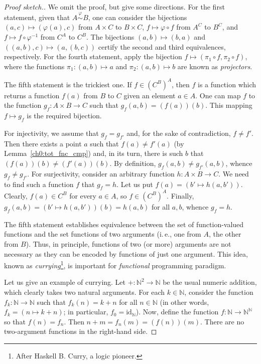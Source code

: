 \documentclass[12pt,notitlepage]{article}
\theoremstyle{plain}
\theoremstyle{definition}
\theoremstyle{plain}
\newcommand{\N}{\mathbb{N}}
\renewcommand{\phi}{\varphi}
\newcommand{\id}{\mathrm{id}}
\newcommand{\1}{\mathbf{1}}
\newcommand{\0}{\mathbf{0}}
\begin{document}
\begin{proof}[Proof sketch.]
	We omit the proof, but give some directions. For the first statement, given that $A \stackrel{\phi}{\sim} B$, one can consider the bijections $(a,c) \mapsto (\phi(a),c)$ from $A \times C$ to $B \times C$, $f \mapsto \phi \circ f$ from $A^C$ to $B^C$, and $f \mapsto f \circ \phi^{-1}$ from $C^A$ to $C^B$. The bijections $(a,b) \mapsto (b,a)$ and $((a,b),c) \mapsto (a,(b,c))$ certify the second and third equivalences, respectively. For the fourth statement, apply the bijection $f \mapsto (\pi_1 \circ f, \pi_2 \circ f)$, where the functions $\pi_1 \colon (a,b) \mapsto a$ and $\pi_2 \colon (a,b) \mapsto b$ are known as \emph{projectors}.
	
	The fifth statement is the trickiest one. If $f \in (C^B)^A$, then $f$ is a function which returns a function $f(a)$ from $B$ to $C$ given an element $a \in A$. One can map $f$ to the function $g_f\colon A \times B \to C$ such that $g_f(a,b) = (f(a))(b)$. This mapping $f \mapsto g_f$ is the required bijection.
	
	For injectivity, we assume that $g_f = g_{f'}$ and, for the sake of contradiction, $f \neq f'$. Then there exists a point $a$ such that $f(a) \neq f'(a)$ (by Lemma~\ref{ch0:tot_fnc_cmp}) and, in its turn, there is such $b$ that $(f(a))(b) \neq (f'(a))(b)$. By definition, $g_f(a,b) \neq g_{f'}(a,b)$, whence $g_f \neq g_{f'}$. For surjectivity, consider an arbitrary function $h\colon A \times B \to C$. We need to find such a function $f$ that $g_f = h$. Let us put $f(a) = (b' \mapsto h(a,b'))$. Clearly, $f(a) \in C^B$ for every $a \in A$, so $f \in (C^B)^A$. Finally, $g_f(a,b) = (b' \mapsto h(a,b'))(b) = h(a,b)$ for all $a, b$, whence $g_f = h$.
	
	The fifth statement establishes equivalence between the set of function-valued functions and the set functions of two arguments (i.\,e., one from $A$, the other from $B$). Thus, in principle, functions of two (or more) arguments are not necessary as they can be encoded by functions of just one argument. This idea, known as \emph{currying}\footnote{After Haskell B. Curry, a logic pioneer.}, is important for \emph{functional} programming paradigm.
	
	Let us give an example of currying. Let ${+}\colon \N^2 \to \N$ be the usual numeric addition, which clearly takes two natural arguments. For each $k \in \N$, consider the function $f_k\colon \N \to \N$ such that $f_k(n) = k + n$ for all $n \in \N$ (in other words, $f_k = (n \mapsto k + n)$; in particular, $f_0 = \id_\N$). Now, define the function $f\colon \N \to \N^\N$ so that $f(n) = f_n$. Then $n + m = f_n(m) = (f(n))(m)$. There are no two-argument functions in the right-hand side.
\end{proof}
\end{document}
